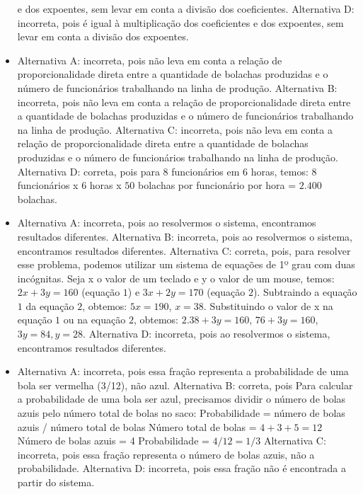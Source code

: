 \begin{itemize}
e dos expoentes, sem levar em conta a divisão dos coeficientes.
Alternativa D: incorreta, pois é igual à multiplicação dos coeficientes
e dos expoentes, sem levar em conta a divisão dos expoentes.
\item Alternativa A: incorreta, pois não leva em conta a relação de
proporcionalidade direta entre a quantidade de bolachas produzidas e o
número de funcionários trabalhando na linha de produção.
Alternativa B: incorreta, pois não leva em conta a relação de
proporcionalidade direta entre a quantidade de bolachas produzidas e o
número de funcionários trabalhando na linha de produção.
Alternativa C: incorreta, pois não leva em conta a relação de
proporcionalidade direta entre a quantidade de bolachas produzidas e o
número de funcionários trabalhando na linha de produção.
Alternativa D: correta, pois para $8$ funcionários em $6$ horas, temos: $8$
funcionários x $6$ horas x $50$ bolachas por funcionário por hora = $2.400$
bolachas.
\item Alternativa A: incorreta, pois ao resolvermos o sistema, encontramos
resultados diferentes.
Alternativa B: incorreta, pois ao resolvermos o sistema, encontramos
resultados diferentes.
Alternativa C: correta, pois, para resolver esse problema, podemos
utilizar um sistema de equações de 1º grau com duas incógnitas. Seja x o
valor de um teclado e y o valor de um mouse, temos: $2x + 3y = 160$ (equação $1$) e $3x + 2y = 170$ (equação $2$). Subtraindo a equação $1$ da equação $2$, obtemos: $5x = 190$, $x = 38$. Substituindo o valor de x na equação $1$ ou na equação $2$, obtemos: $2.38 + 3y = 160$, $76 + 3y = 160$, $3y = 84, y = 28$. 
Alternativa D: incorreta, pois ao resolvermos o sistema, encontramos
resultados diferentes.
\item Alternativa A: incorreta, pois essa fração representa a probabilidade de
uma bola ser vermelha (3/12), não azul.
Alternativa B: correta, pois Para calcular a probabilidade de uma bola
ser azul, precisamos dividir o número de bolas azuis pelo número total
de bolas no saco: Probabilidade = número de bolas azuis / número total
de bolas Número total de bolas = $4 + 3 + 5 = 12$ Número de bolas azuis =
4 Probabilidade = $4/12 = 1/3$
Alternativa C: incorreta, pois essa fração representa o número de bolas
azuis, não a probabilidade.
Alternativa D: incorreta, pois essa fração não é encontrada a partir do
sistema.

\end{itemize}